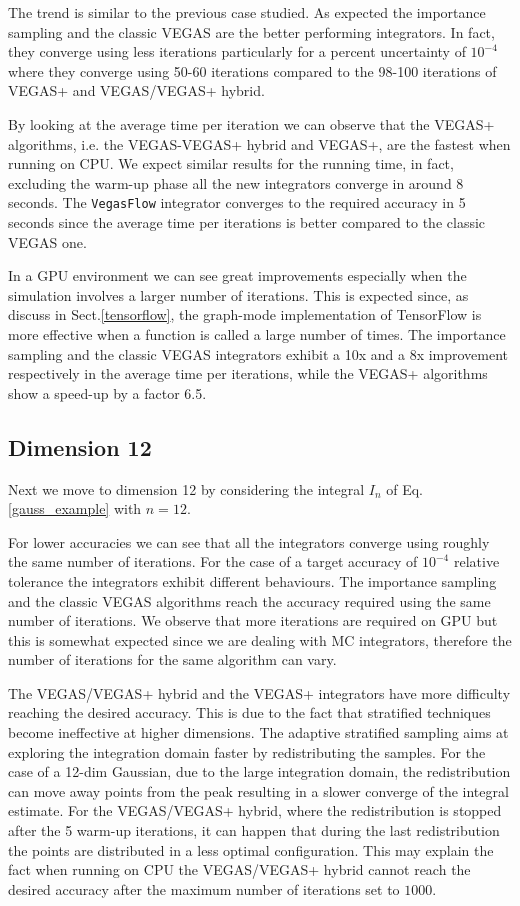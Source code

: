 \documentclass[../main/main.tex]{subfiles}
\begin{document}
The trend is similar to the previous case studied. As expected the importance sampling and the classic VEGAS are the better performing 
integrators. In fact, they converge using less iterations particularly for a percent uncertainty of $10^{-4}$ where they converge using 50-60 iterations compared to the 98-100 iterations of  VEGAS+ and VEGAS/VEGAS+ hybrid.

By looking at the average time per iteration we can observe that the VEGAS+ algorithms, i.e. the VEGAS-VEGAS+ hybrid and VEGAS+,  are the fastest when running on CPU.  We expect similar results for the running time, in fact, excluding the warm-up phase all the new integrators converge in around 8 seconds. The \texttt{VegasFlow} integrator converges to the required accuracy in 5 seconds since the average time per iterations is better compared to
the classic VEGAS one.

In a GPU environment we can see great improvements especially when the simulation involves a larger number of iterations.
This is expected since, as discuss in Sect.\ref{tensorflow},  the graph-mode implementation of TensorFlow  is more effective when a function is called a large number of times. The importance sampling and the classic VEGAS integrators exhibit a 10x and a 8x improvement respectively in the average time per iterations, while the VEGAS+ algorithms show a speed-up by a factor 6.5.

 
 \subsection{Dimension 12}
 Next we move to dimension 12 by considering the integral $I_n$ of Eq.\eqref{gauss_example} with $n = 12$.
 
 For lower accuracies we can see that all the integrators converge using roughly the same number of iterations. For the case of a target accuracy of $10^{-4}$ relative tolerance the integrators exhibit different behaviours. The importance sampling and the classic VEGAS algorithms reach the accuracy required using the same number of iterations. We observe that more iterations are required on GPU but this is somewhat expected since we are dealing with MC integrators, therefore the number of iterations for the same algorithm can vary.
 
The VEGAS/VEGAS+ hybrid and the VEGAS+ integrators have more difficulty reaching the desired accuracy. This is due to the fact that 
stratified techniques become ineffective at higher dimensions. The adaptive stratified sampling aims at exploring the integration domain faster by redistributing the samples. For the case of a 12-dim Gaussian, due to the large integration domain, the redistribution can move away points from the peak resulting in a slower converge of the integral estimate. 
For the VEGAS/VEGAS+ hybrid, where the redistribution is stopped after the 5 warm-up iterations, it can happen that during the last redistribution the points are distributed in a less optimal configuration. This may explain the fact when running on CPU the VEGAS/VEGAS+ hybrid cannot reach the desired accuracy after the maximum number of iterations set to $1000$.
\end{document}
